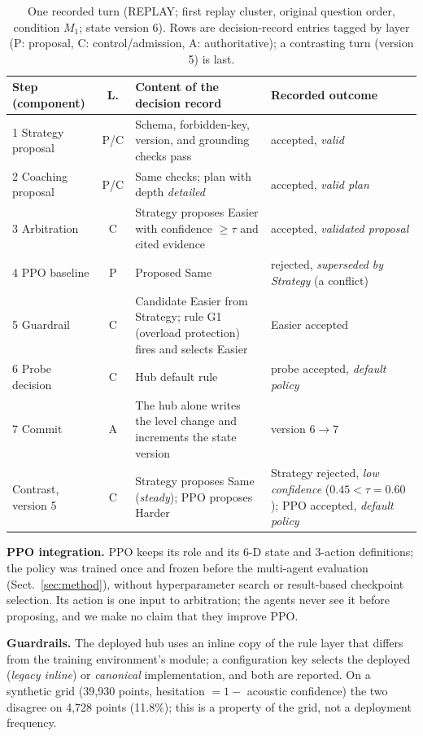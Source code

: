 \documentclass[runningheads,a4paper]{llncs}
\begin{document}
\begin{table}[!htbp]
\caption{One recorded turn (REPLAY; first replay cluster, original question order, condition $M_1$; state version 6). Rows are decision-record entries tagged by layer (P: proposal, C: control/admission, A: authoritative); a contrasting turn (version 5) is last.}
\label{tab:trace}
\centering\footnotesize
\begin{tabular}{@{}L{2.9cm}cL{4.3cm}L{3.3cm}@{}}
\toprule
Step (component) & L. & Content of the decision record & Recorded outcome\\
 Strategy proposal & P/C & Schema, forbidden-key, version, and grounding checks pass & accepted, \emph{valid}\\
2 Coaching proposal & P/C & Same checks; plan with depth \emph{detailed} & accepted, \emph{valid plan}\\
3 Arbitration & C & Strategy proposes Easier with confidence $\ge\tau$ and cited evidence & accepted, \emph{validated proposal}\\
4 PPO baseline & P & Proposed Same & rejected, \emph{superseded by Strategy} (a conflict)\\
5 Guardrail & C & Candidate Easier from Strategy; rule G1 (overload protection) fires and selects Easier & Easier accepted\\
6 Probe decision & C & Hub default rule & probe accepted, \emph{default policy}\\
7 Commit & A & The hub alone writes the level change and increments the state version & version $6\to7$\\
\addlinespace
Contrast, version 5 & C & Strategy proposes Same (\emph{steady}); PPO proposes Harder & Strategy rejected, \emph{low confidence} ($0.45<\tau=0.60$); PPO accepted, \emph{default policy}\\
\bottomrule
\end{tabular}
\end{table}

\textbf{PPO integration.} PPO keeps its role and its 6-D state and 3-action definitions; the policy was trained once and frozen before the multi-agent evaluation (Sect.~\ref{sec:method}), without hyperparameter search or result-based checkpoint selection. Its action is one input to arbitration; the agents never see it before proposing, and we make no claim that they improve PPO.

\textbf{Guardrails.} The deployed hub uses an inline copy of the rule layer that differs from the training environment's module; a configuration key selects the deployed (\emph{legacy inline}) or \emph{canonical} implementation, and both are reported. On a synthetic grid (39,930 points, hesitation $=1-$ acoustic confidence) the two disagree on 4,728 points (11.8\%); this is a property of the grid, not a deployment frequency.
\end{document}
